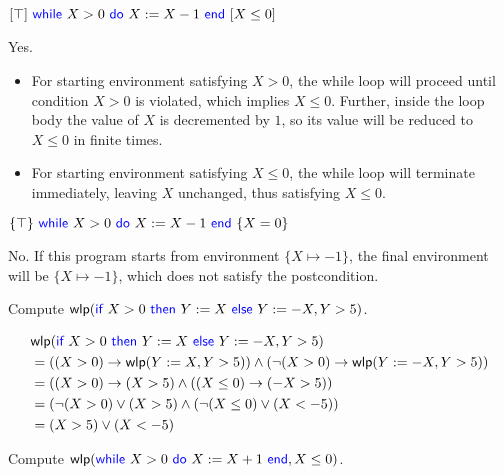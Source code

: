 \documentclass[11pt,a4paper]{article}
\newcommand{\kword}[1]{{\color{blue} \textsf{#1}}}
\newcommand{\If}{\kword{if}}
\newcommand{\Then}{\kword{then}}
\newcommand{\Else}{\kword{else}}
\newcommand{\While}{\kword{while}}
\newcommand{\Do}{\kword{do}}
\newcommand{\End}{\kword{end}}
\newcommand{\wlp}[2]{\textsf{wlp}(#1, #2)}
\begin{document}
\subproblem $[\top]~\While~X > 0~\Do~X := X - 1~\End~[X \le 0]$

\begin{solution}
  Yes.
  
  \begin{itemize}
    \item For starting environment satisfying $X > 0$, the while loop will proceed until condition $X > 0$ is violated, which implies $X \le 0$. Further, inside the loop body the value of $X$ is decremented by $1$, so its value will be reduced to $X \le 0$ in finite times.
    \item For starting environment satisfying $X \le 0$, the while loop will terminate immediately, leaving $X$ unchanged, thus satisfying $X \le 0$.
  \end{itemize}
\end{solution}

\subproblem $\{\top\}~\While~X > 0~\Do~X := X - 1~\End~\{X = 0\}$

\begin{solution}
  No. If this program starts from environment $\{X \mapsto -1\}$, the final environment will be $\{X \mapsto -1\}$, which does not satisfy the postcondition.
\end{solution}

\newpage
{}

\subproblem Compute $\wlp{\If~X > 0~\Then~Y := X~\Else~Y := -X}{Y > 5}$.

\begin{solution}
  \begin{align*}
    & \wlp{\If~X > 0~\Then~Y := X~\Else~Y := -X}{Y > 5} \\
    &= ((X > 0) \rightarrow \wlp{Y := X}{Y > 5}) \land (\lnot (X > 0) \rightarrow \wlp{Y := -X}{Y > 5}) \\
    &= ((X > 0) \rightarrow (X > 5) \land ((X \le 0) \rightarrow (-X > 5)) \\
    &= (\lnot (X > 0) \lor (X > 5) \land (\lnot (X \le 0) \lor (X < -5)) \\
    &= (X > 5) \lor (X < -5)
  \end{align*}
\end{solution}

\subproblem Compute $\wlp{\While~X > 0~\Do~X := X + 1~\End}{X \le 0}$.
\end{document}
